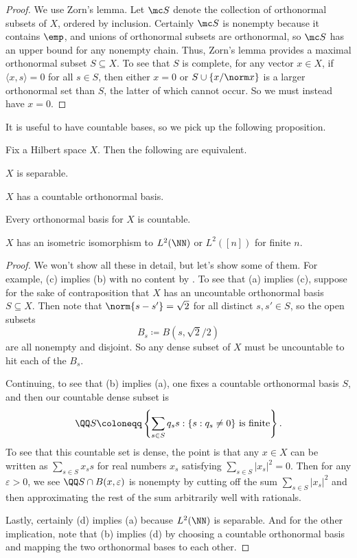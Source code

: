 \documentclass[../notes.tex]{subfiles}
\begin{document}
\begin{proof}
	We use Zorn's lemma. Let $\mc S$ denote the collection of orthonormal subsets of $X$, ordered by inclusion. Certainly $\mc S$ is nonempty because it contains $\emp$, and unions of orthonormal subsets are orthonormal, so $\mc S$ has an upper bound for any nonempty chain. Thus, Zorn's lemma provides a maximal orthonormal subset $S\subseteq X$. To see that $S$ is complete, for any vector $x\in X$, if $\langle x,s\rangle=0$ for all $s\in S$, then either $x=0$ or $S\cup\{x/\norm x\}$ is a larger orthonormal set than $S$, the latter of which cannot occur. So we must instead have $x=0$.
\end{proof}
It is useful to have countable bases, so we pick up the following proposition.
\begin{proposition}
	Fix a Hilbert space $X$. Then the following are equivalent.
	\begin{listalph}
		\item $X$ is separable.
		\item $X$ has a countable orthonormal basis.
		\item Every orthonormal basis for $X$ is countable.
		\item $X$ has an isometric isomorphism to $L^2(\NN)$ or $L^2([n])$ for finite $n$.
	\end{listalph}
\end{proposition}
\begin{proof}
	We won't show all these in detail, but let's show some of them. For example, (c) implies (b) with no content by . To see that (a) implies (c), suppose for the sake of contraposition that $X$ has an uncountable orthonormal basis $S\subseteq X$. Then note that $\norm{s-s'}=\sqrt2$ for all distinct $s,s'\in S$, so the open subsets
	\[B_s\coloneqq B(s,\sqrt2/2)\]
	are all nonempty and disjoint. So any dense subset of $X$ must be uncountable to hit each of the $B_s$.

	Continuing, to see that (b) implies (a), one fixes a countable orthonormal basis $S$, and then our countable dense subset is
	\[\QQ S\coloneqq\left\{\sum_{s\in S}q_ss:\{s:q_s\ne0\}\text{ is finite}\right\}.\]
	To see that this countable set is dense, the point is that any $x\in X$ can be written as $\sum_{s\in S}x_ss$ for real numbers $x_s$ satisfying $\sum_{s\in S}\left|x_s\right|^2=0$. Then for any $\varepsilon>0$, we see $\QQ S\cap B(x,\varepsilon)$ is nonempty by cutting off the sum $\sum_{s\in S}\left|x_s\right|^2$ and then approximating the rest of the sum arbitrarily well with rationals.

	Lastly, certainly (d) implies (a) because $L^2(\NN)$ is separable. And for the other implication, note that (b) implies (d) by choosing a countable orthonormal basis and mapping the two orthonormal bases to each other.
\end{proof}
\end{document}
